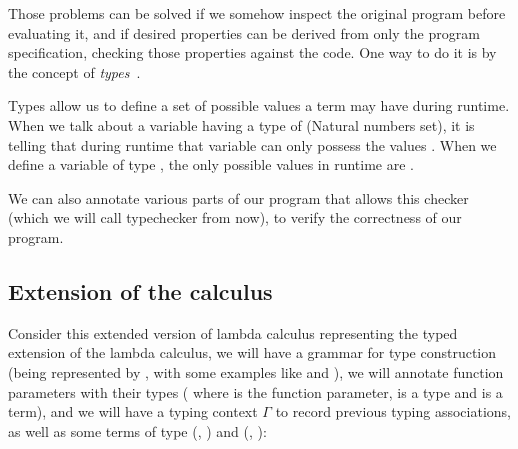 Those problems can be solved if we somehow inspect the original program before evaluating it, and if desired properties can be derived from only the program specification, checking those properties against the code. One way to do it is by the concept of \emph{types}~\cite{tapl}.

Types allow us to define a set of possible values a term may have during runtime. When we talk about a variable having a type of  (Natural numbers set), it is telling that during runtime that variable can only possess the values . When we define a variable of type , the only possible values in runtime are .

We can also annotate various parts of our program that allows this checker (which we will call typechecker from now), to verify the correctness of our program.

\subsection{Extension of the calculus}

Consider this extended version of lambda calculus representing the typed extension of the lambda calculus, we will have a grammar for type construction (being represented by , with some examples like  and ), we will annotate function parameters with their types ( where  is the function parameter,  is a type and  is a term), and we will have a typing context $\Gamma$ to record previous typing associations, as well as some terms of type  (, ) and  (, ):

